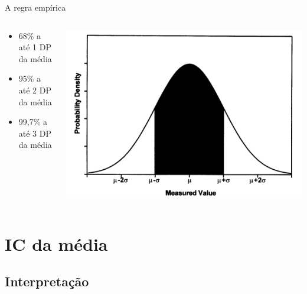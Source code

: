 \documentclass{beamer}
\begin{document}
\begin{frame}{A regra empírica}
  \begin{columns}
    \begin{column}{5cm}
      \begin{itemize}
      \item 68\% a até 1 DP da média
      \item 95\% a até 2 DP da média
      \item 99,7\% a até 3 DP da média
      \end{itemize}
    \end{column}
    \begin{column}{5cm}
      \includegraphics[width=\textwidth]{Cap4/empirica}
    \end{column}
  \end{columns}
\end{frame}

\section{IC da média}

\subsection{Interpretação}

\end{document}
